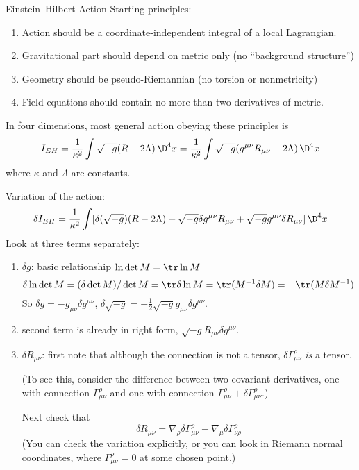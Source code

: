 \begin{Boxed}{Einstein--Hilbert Action}\label{box:EHAction}
Starting principles:
\begin{enumerate}
\item Action should be a coordinate-independent integral of a
local Lagrangian.
\item Gravitational part should depend on metric only (no
``background structure'')
\item Geometry should be pseudo-Riemannian (no torsion or
nonmetricity)
\item Field equations should contain no more than two derivatives
of metric.
\end{enumerate}

In four dimensions, most general action obeying these principles
is 
\begin{equation}
I_{EH} = \frac{1}{\kappa^{2}}\int\sqrt{-g}(R-2\Lambda)\,\D^{4}x
       = \frac{1}{\kappa^{2}}\int\sqrt{-g}(g^{\mu\nu}R_{\mu\nu}-2\Lambda)\,\D^{4}x
\end{equation}
where $\kappa$ and $\Lambda$ are constants.

Variation of the action:
\begin{equation}
\delta I_{EH} = \frac{1}{\kappa^{2}}\int[\delta(\sqrt{-g})(R-2\Lambda)
+ \sqrt{-g}\delta g^{\mu\nu} R_{\mu\nu}+\sqrt{-g}g^{\mu\nu}\delta
  R_{\mu\nu}]\,\D^{4}x
\end{equation}
Look at three terms separately:
\begin{enumerate}
\item $\delta g$: basic relationship $\ln\det M=\tr\ln M$
\begin{equation}
\delta\ln\det M = (\delta\det M)/\det M = \tr\delta\ln
M=\tr(M^{-1}\delta M)=-\tr(M\delta M^{-1})
\end{equation}
So $\delta g=-g_{\mu\nu}\delta g^{\mu\nu}$, \quad
$\delta\sqrt{-g}=-\frac{1}{2}\sqrt{-g}g_{\mu\nu}\delta
g^{\mu\nu}$.
\item second term is already in right form,
$\sqrt{-g}R_{\mu\nu}\delta g^{\mu\nu}$.
\item $\delta R_{\mu\nu}$: first note that although the
connection is not a tensor, $\delta\Gamma^{\rho}_{\mu\nu}$
\emph{is} a tensor.

(To see this, consider the difference between two covariant
derivatives, one with connection $\Gamma^{\rho}_{\mu\nu}$ and one
with connection
$\Gamma^{\rho}_{\mu\nu}+\delta\Gamma^{\rho}_{\mu\nu}$.)

Next check that
\begin{equation}
\delta R_{\mu\nu}
=\nabla_{\rho}\delta\Gamma^{\rho}_{\mu\nu}-\nabla_{\mu}\delta\Gamma^{\rho}_{\nu\rho}
\end{equation}
(You can check the variation explicitly, or you can look in
Riemann normal coordinates, where $\Gamma^{\rho}_{\mu\nu}=0$ at
some chosen point.)


\end{enumerate}
\end{Boxed}
